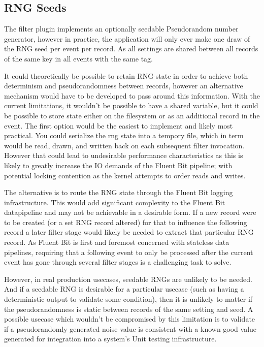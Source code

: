 \subsection{RNG Seeds}
The filter plugin implements an optionally seedable Pseudorandom number generator, however in practice, the application will only ever make one draw of the RNG seed per event per record. As all settings are shared between all records of the same key in all events with the same tag.

It could theoretically be possible to retain RNG-state in order to achieve both determinism and pseudorandomness between records, however an alternative mechanism would have to be developed to pass around this information. With the current limitations, it wouldn't be possible to have a shared variable, but it could be possible to store state either on the filesystem or as an additional record in the event. The first option would be the easiest to implement and likely most practical. You could serialize the rng state into a tempory file, which in term would be read, drawn, and written back on each subsequent filter invocation. However that could lead to undesirable performance characteristics as this is likely to greatly increase the IO demands of the Fluent Bit pipeline; with potential locking contention as the kernel attempts to order reads and writes.

The alternative is to route the RNG state through the Fluent Bit logging infrastructure. This would add significant complexity to the Fluent Bit datapipeline and may not be achievable in a desirable form. If a new record were to be created (or a set RNG record altered) for that to influence the following record a later filter stage would likely be needed to extract that particular RNG record. As Fluent Bit is first and foremost concerned with stateless data pipelines, requiring that a following event to only be processed after the current event has gone through several filter stages is a challenging task to solve. 

However, in real production usecases, seedable RNGs are unlikely to be needed. And if a seedable RNG is desirable for a particular usecase (such as having a deterministic output to validate some condition), then it is unlikely to matter if the pseudorandomness is static between records of the same setting and seed. A possible usecase which wouldn't be compromised by this limitation is to validate if a pseudorandomly generated noise value is consistent with a known good value generated for integration into a system's Unit testing infrastructure. 


